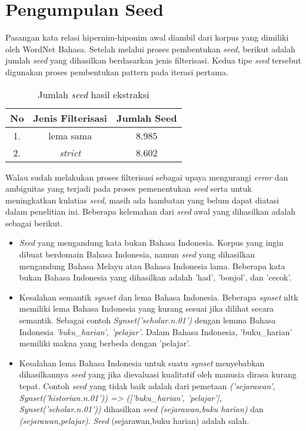 %
\section{Pengumpulan Seed}
Pasangan kata relasi hipernim-hiponim awal diambil dari korpus yang dimiliki oleh WordNet Bahasa. Setelah melalui proses pembentukan \textit{seed}, berikut adalah jumlah \textit{seed} yang dihasilkan berdasarkan jenis filterisasi. Kedua tipe \textit{seed} tersebut digunakan proses pembentukan pattern pada iterasi pertama. 

\begin{table}
  \centering
    \caption{Jumlah \textit{seed} hasil ekstraksi}
      \label{table:jumlahSeed}
      \begin{tabular}{|c|c|c|}
        \hline
          No & Jenis Filterisasi & Jumlah Seed \\ \hline
          1. & lema sama         & 8.985       \\ \hline
          2. & \textit{strict}   & 8.602       \\ \hline
    \end{tabular}
\end{table}

Walau sudah melakukan proses filterisasi sebagai upaya mengurangi \textit{error} dan ambiguitas yang terjadi pada proses pemenentukan \textit{seed} serta untuk meningkatkan kulatias \textit{seed}, masih ada hambatan yang belum dapat diatasi dalam penelitian ini. Beberapa kelemahan dari \textit{seed} awal yang dihasilkan adalah sebagai berikut.

\begin{itemize}
  \item \textit{Seed} yang mengandung kata bukan Bahasa Indonesia. Korpus yang ingin dibuat berdomain Bahasa Indonesia, namun \textit{seed} yang dihasilkan mengandung Bahasa Melayu atau Bahasa Indonesia lama. Beberapa kata bukan Bahasa Indonesia yang dihasilkan adalah 'had', 'bonjol', dan 'cecok'.
  \item Kesalahan semantik \textit{synset} dan lema Bahasa Indonesia. Beberapa \textit{synset} nltk memiliki lema Bahasa Indonesia yang kurang sesuai jika dilihat secara semantik. Sebagai contoh \textit{Synset('scholar.n.01')} dengan lemma Bahasa Indonesia \textit{{'buku\_harian', 'pelajar'}}. Dalam Bahasa Indonesia, 'buku\_harian' memiliki makna yang berbeda dengan 'pelajar'.
  \item Kesalahan lema Bahasa Indonesia untuk suatu \textit{synset} menyebabkan dihasilkannya \textit{seed} yang jika dievaluasi kualitatif oleh manusia dirasa kurang tepat. Contoh \textit{seed} yang tidak baik adalah dari pemetaan \textit{('sejarawan', Synset('historian.n.01')) => (['buku\_harian', 'pelajar'], Synset('scholar.n.01'))} dihasilkan \textit{seed} \textit{(sejarawan,buku harian)} dan \textit{(sejarawan,pelajar)}. \textit{Seed} (sejarawan,buku harian) adalah salah.
\end{itemize}


